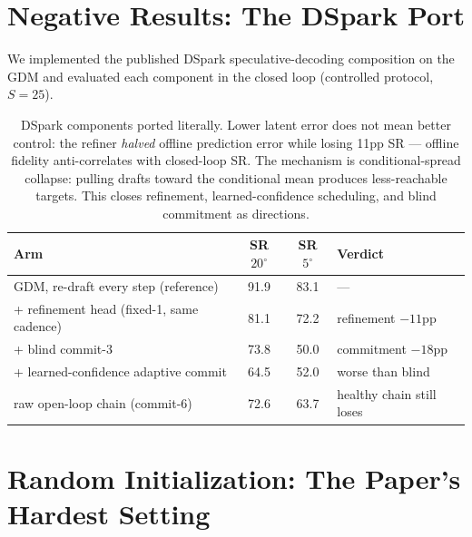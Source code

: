 \documentclass[11pt]{article}
\newcommand{\degc}[1]{$#1^\circ$}
\begin{document}
\section{Negative Results: The DSpark Port}
\label{sec:neg}

We implemented the published DSpark \citep{dspark} speculative-decoding composition on the GDM and
evaluated each component in the closed loop (controlled protocol, $S{=}25$).

\begin{table}[h]
\centering
\caption{DSpark components ported literally. Lower latent error does not mean better
control: the refiner \emph{halved} offline prediction error while losing 11pp SR ---
offline fidelity anti-correlates with closed-loop SR. The mechanism is conditional-spread
collapse: pulling drafts toward the conditional mean produces less-reachable targets.
This closes refinement, learned-confidence scheduling, and blind commitment as directions.}
\label{tab:dspark-neg}
\begin{tabular}{lccl}
\toprule
Arm & SR \degc{20} & SR \degc{5} & Verdict \\
\midrule
GDM, re-draft every step (reference)          & 91.9 & 83.1 & --- \\
+ refinement head (fixed-1, same cadence)     & 81.1 & 72.2 & refinement $-11$pp \\
+ blind commit-3                              & 73.8 & 50.0 & commitment $-18$pp \\
+ learned-confidence adaptive commit          & 64.5 & 52.0 & worse than blind \\
raw open-loop chain (commit-6)                & 72.6 & 63.7 & healthy chain still loses \\
\bottomrule
\end{tabular}
\end{table}

\section{Random Initialization: The Paper's Hardest Setting}
\label{sec:randinit}
\end{document}
